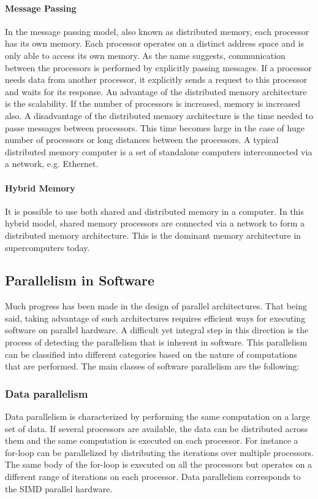 \paragraph{Message Passing} In the message passing model, also known as distributed memory, each processor has its own memory. Each processor operates on a distinct address space and is only able to access its own memory. As the name suggests, communication between the processors is performed by explicitly passing messages. If a processor needs data from another processor, it explicitly sends a request to this processor and waits for its response. An advantage of the distributed memory architecture is the scalability. If the number of processors is increased, memory is increased also. A disadvantage of the distributed memory architecture is the time needed to passe messages between processors. This time becomes large in the case of huge number of processors or long distances between the processors. A typical distributed memory computer is a set of standalone computers interconnected via a network, e.g. Ethernet.

\paragraph{Hybrid Memory}

It is possible to use both shared and distributed memory in a computer. In this hybrid model, shared memory processors are connected via a network to form a distributed memory architecture. This is the dominant memory architecture in supercomputers today.

\subsection{Parallelism in Software}

Much progress has been made in the design of parallel architectures. That being said, taking advantage of such architectures requires efficient ways for executing software on parallel hardware. A difficult yet integral step in this direction is the process of detecting the parallelism that is inherent in software. This parallelism can be classified into different categories based on the nature of computations that are performed. The main classes of software parallelism are the following:    

\subsubsection{Data parallelism}
Data parallelism is characterized by performing the same computation on a large set of data. If several processors are available, the data can be distributed across them and the same computation is executed on each processor. For instance a for-loop can be parallelized by distributing the iterations over multiple processors. The same body of the for-loop is executed on all the processors but operates on a different range of iterations on each processor. Data parallelism corresponds to the SIMD parallel hardware.


